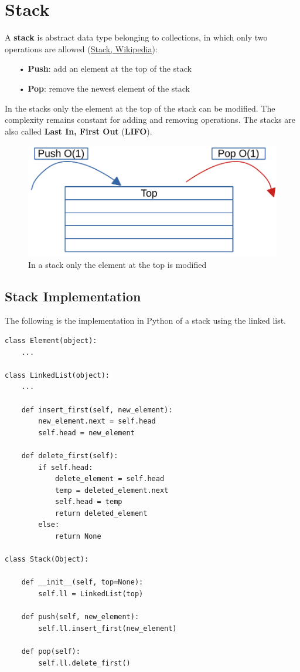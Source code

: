 \section{Stack}
A \textbf{stack} is abstract data type belonging to collections, in which only two operations are allowed \cite{wikistack} (\href{https://en.wikipedia.org/wiki/Stack_(abstract_data_type)}{Stack, Wikipedia}):
\begin{itemize}
\item[•] \textbf{Push}: add an element at the top of the stack
\item[•] \textbf{Pop}: remove the newest element of the stack
\end{itemize}
In the stacks only the element at the top of the stack can be modified. The complexity remains constant for adding and removing operations. The stacks are also called \textbf{Last In, First Out} (\textbf{LIFO}).
\begin{figure}[H]
	\begin{center}
		\includegraphics[scale=.6]{chapters/datastructures/images/stack_1.pdf}
		\caption[In a stack only the element at the top is modified]{In a stack only the element at the top is modified}
		\label{stack_1}
	\end{center}
\end{figure}
\subsection{Stack Implementation}
The following is the implementation in Python of a stack using the linked list.
\begin{lstlisting}[firstnumber=1, caption={Stack implementation.}]
class Element(object):
	...

class LinkedList(object):
	...
	
	def insert_first(self, new_element):
		new_element.next = self.head
		self.head = new_element
	
	def delete_first(self):
		if self.head:
			delete_element = self.head
			temp = deleted_element.next
			self.head = temp
			return deleted_element
		else:
			return None

class Stack(Object):
	
	def __init__(self, top=None):
		self.ll = LinkedList(top)
		
	def push(self, new_element):
		self.ll.insert_first(new_element)
	
	def pop(self):
		self.ll.delete_first()
\end{lstlisting}

